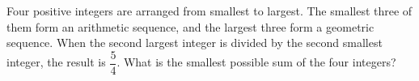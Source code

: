 Four positive integers are arranged from smallest to largest. The smallest three of them form an arithmetic sequence, and the largest three form a geometric sequence. When the second largest integer is divided by the second smallest integer, the result is $\dfrac54$. What is the smallest possible sum of the four integers?
